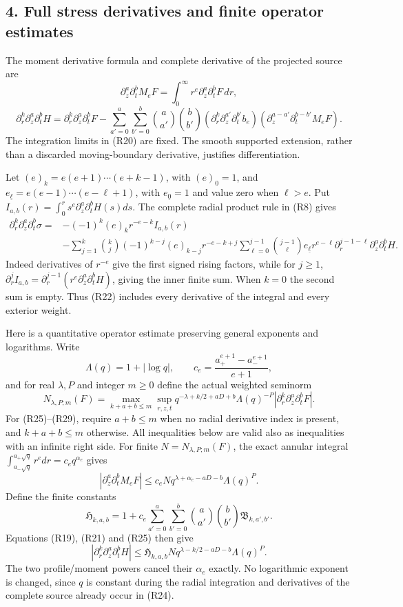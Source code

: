 \documentclass[10pt,a4paper]{article}
\begin{document}
\subsection{4. Full stress derivatives and finite operator estimates}\label{nsupstream:radial_stress_reconstruction_audit:full-stress-derivatives-and-finite-operator-estimates}

The moment derivative formula and complete derivative of the projected source are \[
\partial_z^a\partial_t^bM_eF=\int_0^\infty r^e\partial_z^a\partial_t^bF\,dr,
\tag{R20}
\] \[
\partial_r^k\partial_z^a\partial_t^bH
=\partial_r^k\partial_z^a\partial_t^bF
-\sum_{a'=0}^a\sum_{b'=0}^b\binom a{a'}\binom b{b'}
(\partial_r^k\partial_z^{a'}\partial_t^{b'}b_e)
(\partial_z^{a-a'}\partial_t^{b-b'}M_eF).
\tag{R21}
\] The integration limits in (R20) are fixed. The smooth supported extension, rather than a discarded moving-boundary derivative, justifies differentiation.

Let \((e)_k=e(e+1)\cdots(e+k-1)\), with \((e)_0=1\), and \(e_{\underline\ell}=e(e-1)\cdots(e-\ell+1)\), with \(e_{\underline0}=1\) and value zero when \(\ell>e\). Put \(I_{a,b}(r)=\int_0^rs^e\partial_z^a\partial_t^bH(s)ds\). The complete radial product rule in (R8) gives \[
\begin{aligned}
\partial_r^k\partial_z^a\partial_t^b\sigma
={}&-(-1)^k(e)_k r^{-e-k}I_{a,b}(r)\\
&-\sum_{j=1}^k\binom kj(-1)^{k-j}(e)_{k-j}r^{-e-k+j}
\sum_{\ell=0}^{j-1}\binom{j-1}\ell e_{\underline\ell}r^{e-\ell}
\partial_r^{j-1-\ell}\partial_z^a\partial_t^bH.
\end{aligned}
\tag{R22}
\] Indeed derivatives of \(r^{-e}\) give the first signed rising factors, while for \(j\ge1\), \(\partial_r^jI_{a,b}=\partial_r^{j-1}(r^e\partial_z^a\partial_t^bH)\), giving the inner finite sum. When \(k=0\) the second sum is empty. Thus (R22) includes every derivative of the integral and every exterior weight.

Here is a quantitative operator estimate preserving general exponents and logarithms. Write \[
\Lambda(q)=1+|\log q|,\qquad
c_e=\frac{a_+^{e+1}-a_-^{e+1}}{e+1},
\tag{R23}
\] and for real \(\lambda,P\) and integer \(m\ge0\) define the actual weighted seminorm \[
N_{\lambda,P;m}(F)=
\max_{k+a+b\le m}\sup_{r,z,t}
q^{-\lambda+k/2+aD+b}\Lambda(q)^{-P}
|\partial_r^k\partial_z^a\partial_t^bF|.
\tag{R24}
\] For (R25)--(R29), require \(a+b\le m\) when no radial derivative index is present, and \(k+a+b\le m\) otherwise. All inequalities below are valid also as inequalities with an infinite right side. For finite \(N=N_{\lambda,P;m}(F)\), the exact annular integral \(\int_{a_-\sqrt q}^{a_+\sqrt q}r^e dr=c_eq^{\alpha_e}\) gives \[
|\partial_z^a\partial_t^bM_eF|
\le c_eN q^{\lambda+\alpha_e-aD-b}\Lambda(q)^P.
\tag{R25}
\] Define the finite constants \[
\mathfrak H_{k,a,b}=1+c_e\sum_{a'=0}^a\sum_{b'=0}^b
\binom a{a'}\binom b{b'}\mathfrak B_{k,a',b'}.
\tag{R26}
\] Equations (R19), (R21) and (R25) then give \[
|\partial_r^k\partial_z^a\partial_t^bH|
\le\mathfrak H_{k,a,b}N q^{\lambda-k/2-aD-b}\Lambda(q)^P.
\tag{R27}
\] The two profile/moment powers cancel their \(\alpha_e\) exactly. No logarithmic exponent is changed, since \(q\) is constant during the radial integration and derivatives of the complete source already occur in (R24).
\end{document}
